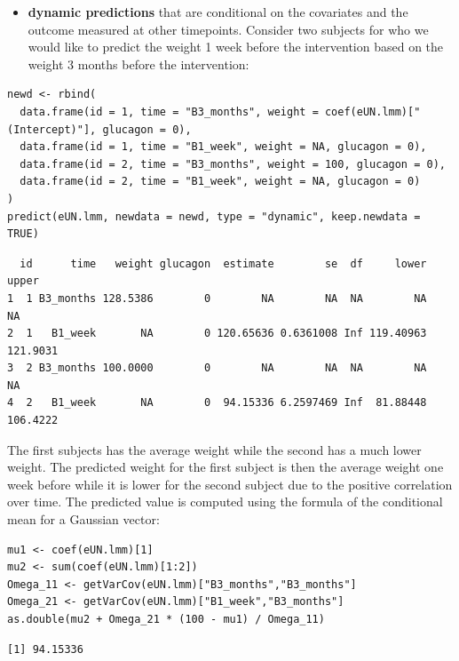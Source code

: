 \documentclass[12pt]{article}
\begin{document}
\clearpage

\begin{itemize}
\item \textbf{dynamic predictions} that are conditional on the covariates and the
outcome measured at other timepoints. Consider two subjects for who
we would like to predict the weight 1 week before the intervention
based on the weight 3 months before the intervention:
\end{itemize}

\begin{lstlisting}
newd <- rbind(
  data.frame(id = 1, time = "B3_months", weight = coef(eUN.lmm)["(Intercept)"], glucagon = 0),
  data.frame(id = 1, time = "B1_week", weight = NA, glucagon = 0),
  data.frame(id = 2, time = "B3_months", weight = 100, glucagon = 0),
  data.frame(id = 2, time = "B1_week", weight = NA, glucagon = 0)
)
predict(eUN.lmm, newdata = newd, type = "dynamic", keep.newdata = TRUE)
\end{lstlisting}

\begin{verbatim}
  id      time   weight glucagon  estimate        se  df     lower    upper
1  1 B3_months 128.5386        0        NA        NA  NA        NA       NA
2  1   B1_week       NA        0 120.65636 0.6361008 Inf 119.40963 121.9031
3  2 B3_months 100.0000        0        NA        NA  NA        NA       NA
4  2   B1_week       NA        0  94.15336 6.2597469 Inf  81.88448 106.4222
\end{verbatim}


The first subjects has the average weight while the second has a much
  lower weight. The predicted weight for the first subject is then the
  average weight one week before while it is lower for the second
  subject due to the positive correlation over time. The predicted
  value is computed using the formula of the conditional mean for a
  Gaussian vector:
\lstset{language=r,label= ,caption= ,captionpos=b,numbers=none}
\begin{lstlisting}
mu1 <- coef(eUN.lmm)[1]
mu2 <- sum(coef(eUN.lmm)[1:2])
Omega_11 <- getVarCov(eUN.lmm)["B3_months","B3_months"]
Omega_21 <- getVarCov(eUN.lmm)["B1_week","B3_months"]
as.double(mu2 + Omega_21 * (100 - mu1) / Omega_11)
\end{lstlisting}

\begin{verbatim}
[1] 94.15336
\end{verbatim}
\end{document}
